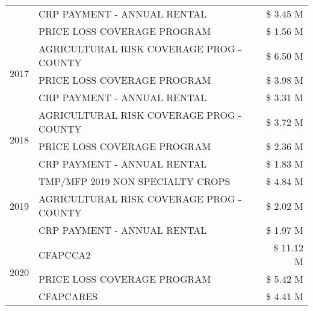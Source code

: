 \begin{tabular}{llr}
 & CRP PAYMENT - ANNUAL RENTAL & \$ 3.45 M \\
 & PRICE LOSS COVERAGE PROGRAM & \$ 1.56 M \\
\cline{1-3}
\multirow[t]{3}{*}{2017} & AGRICULTURAL RISK COVERAGE PROG - COUNTY & \$ 6.50 M \\
 & PRICE LOSS COVERAGE PROGRAM & \$ 3.98 M \\
 & CRP PAYMENT - ANNUAL RENTAL & \$ 3.31 M \\
\cline{1-3}
\multirow[t]{3}{*}{2018} & AGRICULTURAL RISK COVERAGE PROG - COUNTY & \$ 3.72 M \\
 & PRICE LOSS COVERAGE PROGRAM & \$ 2.36 M \\
 & CRP PAYMENT - ANNUAL RENTAL & \$ 1.83 M \\
\cline{1-3}
\multirow[t]{3}{*}{2019} & TMP/MFP 2019 NON SPECIALTY CROPS & \$ 4.84 M \\
 & AGRICULTURAL RISK COVERAGE PROG - COUNTY & \$ 2.02 M \\
 & CRP PAYMENT - ANNUAL RENTAL & \$ 1.97 M \\
\cline{1-3}
\multirow[t]{3}{*}{2020} & CFAPCCA2 & \$ 11.12 M \\
 & PRICE LOSS COVERAGE PROGRAM & \$ 5.42 M \\
 & CFAPCARES & \$ 4.41 M \\
\cline{1-3}
\bottomrule
\end{tabular}

